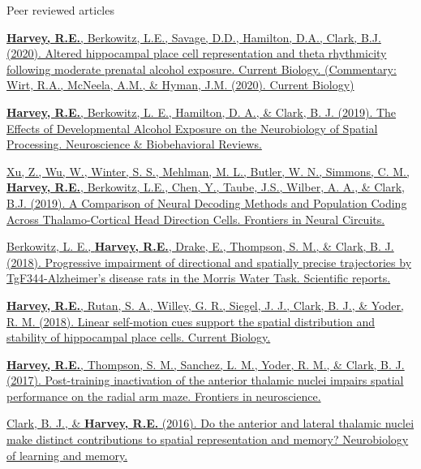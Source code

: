 \begin{cventries}
\cventry
    {Peer reviewed articles} %
    {} %
    {} %
    {} %
    {
      \begin{cvitems} %
      \setlength\itemsep{0.5em}
            \item {\href{https://doi.org/10.1016/j.cub.2020.06.077}{\textbf{Harvey, R.E.}, Berkowitz, L.E., Savage, D.D., Hamilton, D.A., Clark, B.J. (2020). Altered hippocampal place cell representation and theta rhythmicity following moderate prenatal alcohol exposure. Current Biology.}\href{https://doi.org/10.1016/j.cub.2020.07.020}{{ (\scriptsize Commentary: Wirt, R.A., McNeela, A.M., \& Hyman, J.M. (2020). Current Biology})}}
            \item {\href{https://doi.org/10.1016/j.neubiorev.2019.09.018}{\textbf{Harvey, R.E.}, Berkowitz, L. E., Hamilton, D. A., \& Clark, B. J. (2019). The Effects of Developmental Alcohol Exposure on the Neurobiology of Spatial Processing. Neuroscience \& Biobehavioral Reviews.}}
            \item {\href{https://doi.org/10.3389/fncir.2019.00075}{Xu, Z., Wu, W., Winter, S. S., Mehlman, M. L., Butler, W. N., Simmons, C. M., \textbf{Harvey, R.E.}, Berkowitz, L.E., Chen, Y., Taube, J.S., Wilber, A. A., \& Clark, B.J. (2019). A Comparison of Neural Decoding Methods and Population Coding Across Thalamo-Cortical Head Direction Cells. Frontiers in Neural Circuits.}}
            \item {\href{https://doi.org/10.1038/s41598-018-34368-w}{Berkowitz, L. E., \textbf{Harvey, R.E.}, Drake, E., Thompson, S. M., \& Clark, B. J. (2018). Progressive impairment of directional and spatially precise trajectories by TgF344-Alzheimer’s disease rats in the Morris Water Task. Scientific reports.}} 
            \item {\href{https://doi.org/10.1016/j.cub.2018.04.034}{\textbf{Harvey, R.E.}, Rutan, S. A., Willey, G. R., Siegel, J. J., Clark, B. J., \& Yoder, R. M. (2018). Linear self-motion cues support the spatial distribution and stability of hippocampal place cells. Current Biology.}}
            \item {\href{https://doi.org/10.3389/fnins.2017.00094}{\textbf{Harvey, R.E.}, Thompson, S. M., Sanchez, L. M., Yoder, R. M., \& Clark, B. J. (2017). Post-training inactivation of the anterior thalamic nuclei impairs spatial performance on the radial arm maze. Frontiers in neuroscience.}} 
            \item {\href{https://doi.org/10.1016/j.nlm.2016.06.002}{Clark, B. J., \& \textbf{Harvey, R.E.} (2016). Do the anterior and lateral thalamic nuclei make distinct contributions to spatial representation and memory? Neurobiology of learning and memory.}}
      \end{cvitems}
    }
    

\end{cventries}
